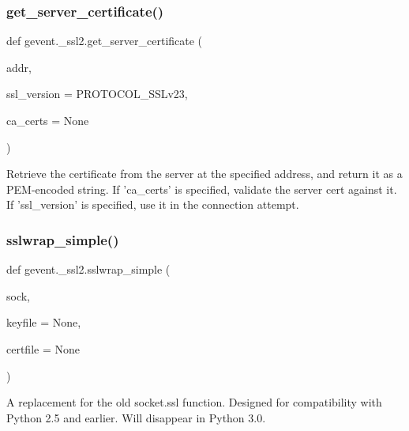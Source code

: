 \subsubsection{\texorpdfstring{get\+\_\+server\+\_\+certificate()}{get\_server\_certificate()}}
{\footnotesize\ttfamily def gevent.\+\_\+ssl2.\+get\+\_\+server\+\_\+certificate (\begin{DoxyParamCaption}\item[{}]{addr,  }\item[{}]{ssl\+\_\+version = {\ttfamily PROTOCOL\+\_\+SSLv23},  }\item[{}]{ca\+\_\+certs = {\ttfamily None} }\end{DoxyParamCaption})}

\begin{DoxyVerb}Retrieve the certificate from the server at the specified address,
and return it as a PEM-encoded string.
If 'ca_certs' is specified, validate the server cert against it.
If 'ssl_version' is specified, use it in the connection attempt.\end{DoxyVerb}
 \mbox{\label{namespacegevent_1_1__ssl2_a0ad7441640c76bee50fb20baedbb028f}} 
\subsubsection{\texorpdfstring{sslwrap\+\_\+simple()}{sslwrap\_simple()}}
{\footnotesize\ttfamily def gevent.\+\_\+ssl2.\+sslwrap\+\_\+simple (\begin{DoxyParamCaption}\item[{}]{sock,  }\item[{}]{keyfile = {\ttfamily None},  }\item[{}]{certfile = {\ttfamily None} }\end{DoxyParamCaption})}

\begin{DoxyVerb}A replacement for the old socket.ssl function.  Designed
for compatibility with Python 2.5 and earlier.  Will disappear in
Python 3.0.\end{DoxyVerb}
 \mbox{\label{namespacegevent_1_1__ssl2_a448e3f7533be4db8be282f333c2d219d}} 
